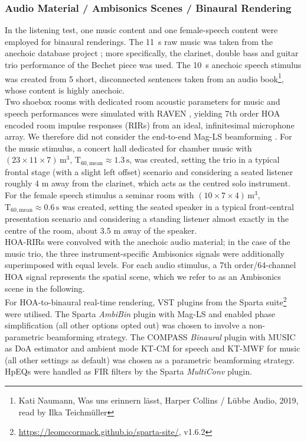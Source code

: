\documentclass[conference]{IEEEtran}
\def\NewL{\\\noindent\hspace*{5mm}}
\begin{document}
\subsubsection{Audio Material / Ambisonics Scenes / Binaural Rendering}
%
In the listening test, one music content and one female-speech content were employed for binaural renderings.
%
The 11~s raw music was taken from the anechoic database project \cite{Therry2019_ICA}; more specifically, the clarinet, double bass and guitar trio performance of the Bechet piece was used.
%
The 10~s anechoic speech stimulus was created from 5 short, disconnected sentences taken from an audio book\footnote{Kati Naumann, Was uns erinnern lässt, Harper Collins / Lübbe Audio, 2019, read by Ilka Teichmüller}, whose content is highly anechoic.
%
%
\NewL Two shoebox rooms with dedicated room acoustic parameters for music and speech performances were simulated with RAVEN \cite{schroder2011_raven}, yielding 7th order HOA encoded room impulse responses (RIRs) from an ideal, infinitesimal microphone array.
%
We therefore did not consider the end-to-end Mag-LS beamforming \cite{Deppisch2021}.
%
For the music stimulus, a concert hall dedicated for chamber music with
$(23\times 11\times 7)\,\mathrm{m}^3$, $\mathrm{T}_{60,\mathrm{mean}} \approx 1.3\,\mathrm{s}$, was created, setting the trio in a typical frontal stage (with a slight left offset) scenario and considering a seated listener roughly 4 m away from the clarinet, which acts as the centred solo instrument.
%
For the female speech stimulus a seminar room with $(10\times 7\times 4)\,\mathrm{m}^3$, $\mathrm{T}_{60,\mathrm{mean}} \approx 0.6\,\mathrm{s}$
was created, setting the seated speaker in a typical front-central presentation scenario and considering a standing listener almost exactly in the centre of the room, about 3.5 m away of the speaker.
%
\NewL HOA-RIRs were convolved with the anechoic audio material; in the case of the music trio, the three instrument-specific Ambisonics signals were additionally superimposed with equal levels.
%
For each audio stimulus, a 7th order/64-channel HOA signal represents the spatial scene, which we refer to as an Ambisonics scene in the following.
%
\NewL For HOA-to-binaural real-time rendering, VST plugins from the Sparta suite\footnote{\url{https://leomccormack.github.io/sparta-site/}, v1.6.2} were utilised.
%
The Sparta \textit{AmbiBin} plugin with Mag-LS and enabled phase simplification (all other options opted out) was chosen to involve a non-parametric beamforming strategy.
%
The COMPASS \textit{Binaural} plugin with MUSIC as DoA estimator and ambient mode KT-CM for speech and KT-MWF for music (all other settings as default) was chosen as a parametric beamforming strategy.
%
HpEQs were handled as FIR filters by the Sparta \textit{MultiConv} plugin.
\end{document}
